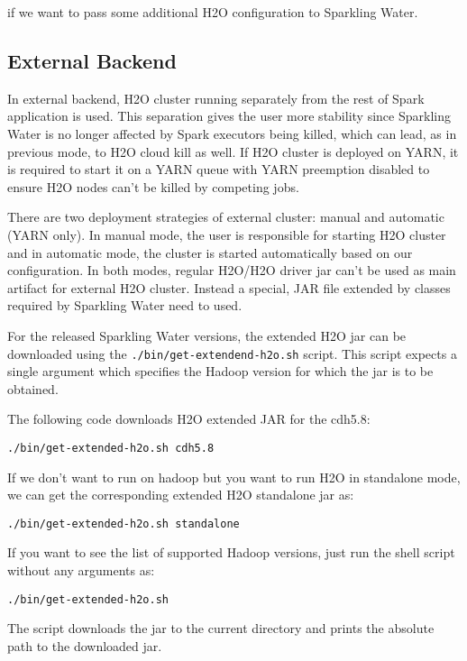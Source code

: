 if we want to pass some additional H2O configuration to Sparkling Water.

\subsection{External Backend}
In external backend, H2O cluster running separately from the rest of Spark application is used. This separation gives the user
more stability since Sparkling Water is no longer affected by Spark executors being killed, which can lead, as in previous mode, to H2O cloud kill as well.
If H2O cluster is deployed on YARN, it is required to start it on a YARN queue with YARN preemption disabled to ensure H2O nodes can't be killed by competing jobs.

There are two deployment strategies of external cluster: manual and automatic (YARN only). In manual mode, the user is responsible for starting H2O cluster and in automatic mode, the cluster is started automatically based on our configuration.
In both modes, regular H2O/H2O driver jar can't be used as main artifact for external H2O cluster. Instead a special, JAR file extended by classes required by Sparkling Water need to used.

For the released Sparkling Water versions, the extended H2O jar can be downloaded using the \texttt{./bin/get-extendend-h2o.sh} script. This script expects a single argument which specifies the Hadoop version for which the jar is to be obtained.

The following code downloads H2O extended JAR for the cdh5.8:

\begin{lstlisting}[style=Bash]
    ./bin/get-extended-h2o.sh cdh5.8
\end{lstlisting}
If we don't want to run on hadoop but you want to run H2O in standalone mode, we can get the corresponding extended H2O standalone jar as:

\begin{lstlisting}[style=Bash]
    ./bin/get-extended-h2o.sh standalone
\end{lstlisting}
If you want to see the list of supported Hadoop versions, just run the shell script without any arguments as:

\begin{lstlisting}[style=Bash]
    ./bin/get-extended-h2o.sh
\end{lstlisting}

The script downloads the jar to the current directory and prints the absolute path to the downloaded jar.

